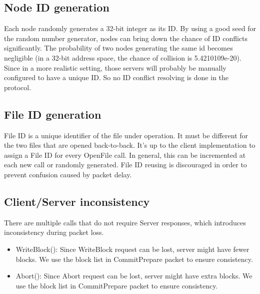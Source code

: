 \documentclass[11pt]{article} %
\begin{document}
\subsection{Node ID generation}
Each node randomly generates a 32-bit integer as its ID.
By using a good seed for the random number generator, 
nodes can bring down the chance of ID conflicts significantly. 
The probability of two nodes generating the same id becomes negligible 
(in a 32-bit address space, the chance of collision is 5.4210109e-20).
Since in a more realistic setting, those servers will probably be manually configured 
to have a unique ID. So no ID conflict resolving is done in the protocol.

\subsection{File ID generation}
File ID is a unique identifier of the file under operation. 
It must be different for the two files that are opened back-to-back.
It's up to the client implementation to assign a File ID for every OpenFile call.
In general, this can be incremented at each new call or randomly generated.
File ID reusing is discouraged in order to prevent confusion caused by packet delay.

\subsection{Client/Server inconsistency}
There are multiple calls that do not require Server responses, 
which introduces inconsistency during packet loss.
\begin{itemize}
    \item WriteBlock(): Since WriteBlock request can be lost, 
        server might have fewer blocks.
        We use the block list in CommitPrepare packet to ensure consistency.
    \item Abort(): Since Abort request can be lost, 
        server might have extra blocks.
        We use the block list in CommitPrepare packet to ensure consistency.
\end{itemize}
\end{document}
